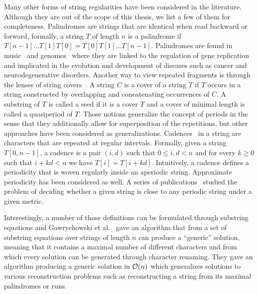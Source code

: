 Many other forms of string regularities have been considered in the literature. Although they are out of the scope of this thesis, we list a few of them for completeness.
Palindromes are strings that are identical when read backward or forward, formally, a string $T$ of length $n$ is a palindrome if $T[n-1] \dots T[1]T[0] = T[0]T[1] \dots T[n-1]$. Palindromes are found in music~\cite{tablecannon,crabcannon} and genomes~\cite{svetec2021palindromes} where they are linked to the regulation of gene replication and implicated in the evolution and development of diseases such as cancer and neurodegenerative disorders.
Another way to view repeated fragments is through the lenses of string covers~\cite{iliopoulos1996covering}. A string $C$ is a cover of a string $T$ if $T$ occurs in a string constructed by overlapping and concatenating occurrences of $C$. A substring of $T$ is called a seed if it is a cover $T$ and a cover of minimal length is called a quasiperiod of $T$. 
Those notions generalize the concept of periods in the sense that they additionally allow for superposition of the repetitions, but other approaches have been considered as generalizations.
Cadences~\cite{AMIR20174} in a string are characters that are repeated at regular intervals. Formally, given a string $T[0,n-1]$, a cadence is a pair $(i,d)$ such that $0 \leq i,d < n$ and for every $k \geq 0$ such that $i+kd < n$ we have $T[i] = T[i+kd]$. Intuitively, a cadence defines a periodicity that is woven regularly inside an aperiodic string.
Approximate periodicity has been considered as well. A series of publications~\cite{SIM2001557,AMIR2015215,AmirICALP2010, KociumakaRADO2018, AMIR20182} studied the problem of deciding whether a given string is close to any periodic string under a given metric.

Interestingly, a number of those definitions can be formulated through substring equations and Gawrychowski et al.~\cite{GAWRYCHOWSKI2020174} gave an algorithm that from a set of substring equations over strings of length $n$ can produce a ``generic'' solution, meaning that it contains a maximal number of different characters and from which every solution can be generated through character renaming. They gave an algorithm producing a generic solution in $\mathcal{O}(n)$ which generalizes solutions to various reconstruction problems such as reconstructing a string from its maximal palindromes or runs.

